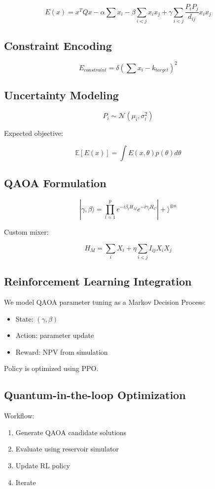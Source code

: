 \documentclass[preprint,12pt]{elsarticle}
\begin{document}
\[
E(x) = x^T Q x - \alpha \sum x_i - \beta \sum_{i<j} x_i x_j + \gamma \sum_{i<j} \frac{P_i P_j}{d_{ij}} x_i x_j
\]

\subsection{Constraint Encoding}

\[
E_{constraint} = \delta (\sum x_i - k_{target})^2
\]

\subsection{Uncertainty Modeling}

\[
P_i \sim \mathcal{N}(\mu_i, \sigma_i^2)
\]

Expected objective:

\[
\mathbb{E}[E(x)] = \int E(x, \theta) p(\theta) d\theta
\]

\subsection{QAOA Formulation}

\[
|\gamma,\beta\rangle = \prod_{l=1}^{p} e^{-i\beta_l H_M} e^{-i\gamma_l H_C} |+\rangle^{\otimes n}
\]

Custom mixer:

\[
H_M = \sum_i X_i + \eta \sum_{i<j} I_{ij} X_i X_j
\]

\subsection{Reinforcement Learning Integration}

We model QAOA parameter tuning as a Markov Decision Process:

\begin{itemize}
\item State: $(\gamma, \beta)$
\item Action: parameter update
\item Reward: NPV from simulation
\end{itemize}

Policy is optimized using PPO.

\subsection{Quantum-in-the-loop Optimization}

Workflow:

\begin{enumerate}
\item Generate QAOA candidate solutions
\item Evaluate using reservoir simulator
\item Update RL policy
\item Iterate
\end{enumerate}
\end{document}
